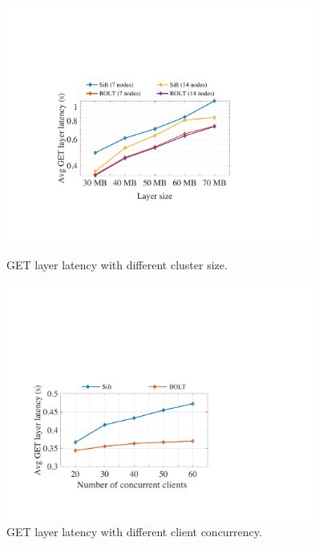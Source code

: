 \begin{figure}[t]
	\centering
	\begin{minipage}{0.3\textwidth}
		\centering
		\includegraphics[width=0.9\textwidth]{graphs/clusterscale.pdf}
		\caption{GET layer latency with different cluster size. 
		 }
		\label{fig:eval-clusterscale}
	\end{minipage}%
	\hspace{1mm}
		\begin{minipage}{0.3\textwidth}
		\centering
		\includegraphics[width=0.9\textwidth]{graphs/clientscale.pdf}
		\caption{GET layer latency with different client concurrency.}
		\label{fig:eval-clientscale}
	\end{minipage}%
	\hspace{1mm}

\end{figure}
